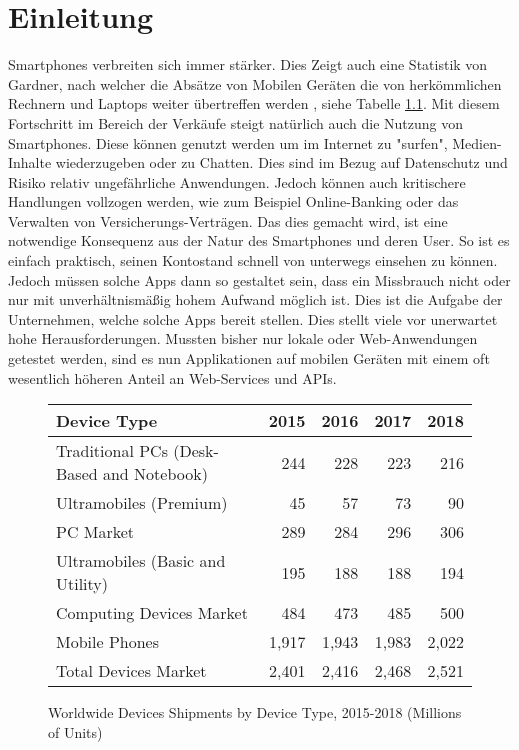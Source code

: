 \chapter{Einleitung}
Smartphones verbreiten sich immer stärker. Dies Zeigt auch eine Statistik von Gardner, nach welcher die Absätze von Mobilen Geräten die von herkömmlichen Rechnern und Laptops weiter übertreffen werden \cite{GartnerSales}, siehe Tabelle \ref{ref:GartnerSalesTable}. Mit diesem Fortschritt im Bereich der Verkäufe steigt natürlich auch die Nutzung von Smartphones. Diese können genutzt werden um im Internet zu "surfen", Medien-Inhalte wiederzugeben oder zu Chatten. Dies sind im Bezug auf Datenschutz und Risiko relativ ungefährliche Anwendungen. Jedoch können auch kritischere Handlungen vollzogen werden, wie zum Beispiel Online-Banking oder das Verwalten von Versicherungs-Verträgen. Das dies gemacht wird, ist eine notwendige Konsequenz aus der Natur des Smartphones und deren User. So ist es einfach praktisch, seinen Kontostand schnell von unterwegs einsehen zu können. Jedoch müssen solche Apps dann so gestaltet sein, dass ein Missbrauch nicht oder nur mit unverhältnismäßig hohem Aufwand möglich ist. Dies ist die Aufgabe der Unternehmen, welche solche Apps bereit stellen. Dies stellt viele vor unerwartet hohe Herausforderungen. Mussten bisher nur lokale oder Web-Anwendungen getestet werden, sind es nun Applikationen auf mobilen Geräten mit einem oft wesentlich höheren Anteil an Web-Services und APIs.

\begin{figure}[htbp]
	\begin{tabular}{ l r r r r}
		Device Type & 2015 & 2016 & 2017 & 2018 \\ \hline
		Traditional PCs (Desk-Based and Notebook) & 244 & 228 & 223 & 216 \\
		Ultramobiles (Premium) & 45 & 57 & 73 & 90 \\
		PC Market & 289 & 284 & 296 & 306 \\
		Ultramobiles (Basic and Utility) & 195 & 188 & 188 & 194 \\
		Computing Devices Market & 484 & 473 & 485 & 500 \\
		Mobile Phones & 1,917 & 1,943 & 1,983 & 2,022 \\
		Total Devices Market & 2,401 & 2,416 & 2,468 & 2,521 \\
	\end{tabular}
	\label{ref:GartnerSalesTable}
	\caption{Worldwide Devices Shipments by Device Type, 2015-2018 (Millions of Units)\cite{GartnerSales}}
\end{figure}

